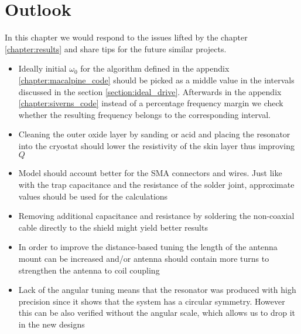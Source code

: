 \chapter{Outlook}

In this chapter we would respond to the issues lifted by the chapter \ref{chapter:results} and share tips for the future similar projects.

\begin{itemize}
	\item Ideally initial $\omega_0$ for the algorithm defined in the appendix \ref{chapter:macalpine_code} should be picked as a middle value in the intervals discussed in the section \ref{section:ideal_drive}. Afterwards in the appendix \ref{chapter:siverns_code} instead of a percentage frequency margin we check whether the resulting frequency belongs to the corresponding interval.
	\item Cleaning the outer oxide layer by sanding or acid and placing the resonator into the cryostat should lower the resistivity of the skin layer thus improving $Q$ \cite{Leupold2015, Fadel2013}
	\item Model should account better for the SMA connectors and wires. Just like with the trap capacitance and the resistance of the solder joint, approximate values should be used for the calculations
	\item Removing additional capacitance and resistance by soldering the non-coaxial cable directly to the shield might yield better results
	\item In order to improve the distance-based tuning the length of the antenna mount can be increased and/or antenna should contain more turns to strengthen the antenna to coil coupling
	\item Lack of the angular tuning means that the resonator was produced with high precision since it shows that the system has a circular symmetry. However this can be also verified without the angular scale, which allows us to drop it in the new designs
\end{itemize}